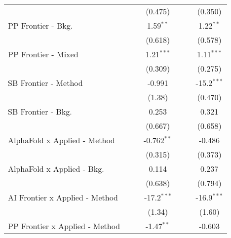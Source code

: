 \begin{tabular}{lcccccc}
                                  &                &               & (0.475)       &                &               & (0.350)\\   
   PP Frontier - Bkg.             &                &               & 1.59$^{**}$   &                &               & 1.22$^{**}$\\   
                                  &                &               & (0.618)       &                &               & (0.578)\\   
   PP Frontier - Mixed            &                &               & 1.21$^{***}$  &                &               & 1.11$^{***}$\\   
                                  &                &               & (0.309)       &                &               & (0.275)\\   
   SB Frontier - Method           &                &               & -0.991        &                &               & -15.2$^{***}$\\   
                                  &                &               & (1.38)        &                &               & (0.470)\\   
   SB Frontier - Bkg.             &                &               & 0.253         &                &               & 0.321\\   
                                  &                &               & (0.667)       &                &               & (0.658)\\   
   AlphaFold x Applied - Method   &                &               & -0.762$^{**}$ &                &               & -0.486\\   
                                  &                &               & (0.315)       &                &               & (0.373)\\   
   AlphaFold x Applied - Bkg.     &                &               & 0.114         &                &               & 0.237\\   
                                  &                &               & (0.638)       &                &               & (0.794)\\   
   AI Frontier x Applied - Method &                &               & -17.2$^{***}$ &                &               & -16.9$^{***}$\\   
                                  &                &               & (1.34)        &                &               & (1.60)\\   
   PP Frontier x Applied - Method &                &               & -1.47$^{**}$  &                &               & -0.603\\   

\end{tabular}

